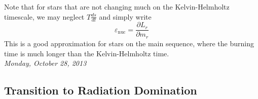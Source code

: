 \documentclass[10pt]{article}
\numberwithin{equation}{section}
\newcommand{\n}{\noindent}
\begin{document}
  \n Note that for stars that are not changing much on the
  Kelvin-Helmholtz timescale, we may neglect $T\frac{ds}{dt}$ and
  simply write
  \begin{equation}
    \label{eq:147}
    \varepsilon_{\mathrm{nuc}}=\frac{\partial L_r}{\partial m_r}
  \end{equation}
  This is a good approximation for stars on the main sequence, where
  the burning time is much longer than the Kelvin-Helmholtz time.\\
	
	 
	\n\textit{Monday, October 28, 2013}

  \subsection{Transition to Radiation Domination}
  \label{sec:transition-to-radiation-domination}
\end{document}
